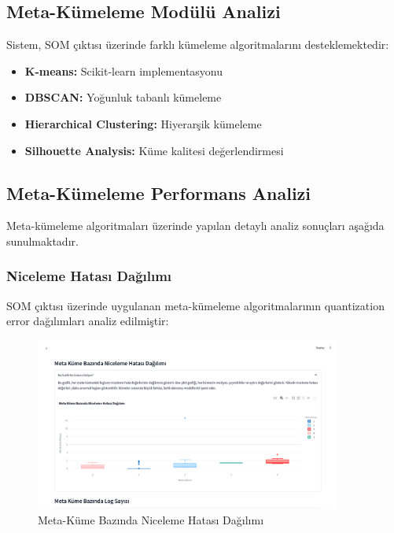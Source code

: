 \newpage

\subsection{Meta-Kümeleme Modülü Analizi}

Sistem, SOM çıktısı üzerinde farklı kümeleme algoritmalarını desteklemektedir:

\begin{itemize}
    \item \textbf{K-means:} Scikit-learn implementasyonu \cite{macqueen1967some}
    \item \textbf{DBSCAN:} Yoğunluk tabanlı kümeleme \cite{ester1996density}
    \item \textbf{Hierarchical Clustering:} Hiyerarşik kümeleme \cite{ward1963hierarchical}
    \item \textbf{Silhouette Analysis:} Küme kalitesi değerlendirmesi \cite{rousseeuw1987silhouettes,dogan2019clustering_performance}
\end{itemize}

\subsection{Meta-Kümeleme Performans Analizi}

Meta-kümeleme algoritmaları üzerinde yapılan detaylı analiz sonuçları aşağıda sunulmaktadır.

\subsubsection{Niceleme Hatası Dağılımı}

SOM çıktısı üzerinde uygulanan meta-kümeleme algoritmalarının quantization error dağılımları analiz edilmiştir:

\begin{figure}[!ht]
    \centering
    \includegraphics[width=0.9\textwidth]{images/meta-kume-bazinda-niceleme-hatasi-dagilimi.png}
    \caption{Meta-Küme Bazında Niceleme Hatası Dağılımı}
    \label{fig:quantization_error_dist}
\end{figure}

